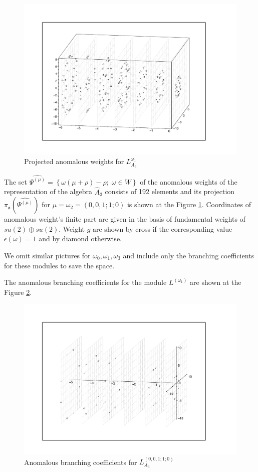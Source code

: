 \documentclass[a4paper,12pt]{article}
\theoremstyle{definition} \newtheorem{Def}{Definition}
\begin{document}
\begin{figure}[h!tb]
  \includegraphics[width=150mm]{A1+A1-A3_anom.pdf}
  \caption{Projected anomalous weights for $L^{\omega_1}_{A_3}$}
  \label{fig:A1+A1-A3_anom}
\end{figure}

The set  $\widehat{\Psi^{(\mu)}}=\left\{\omega(\mu+\rho)-\rho;\; \omega\in W\right\}$ of the anomalous weights of the representation of the algebra $\hat{A}_3$ consists of 192 elements and its projection $\pi_{\mathfrak{a}}\left(\widehat{\Psi^{(\mu)}}\right)$ for $\mu=\omega_2=(0,0,1;1;0)$ is shown at the Figure \ref{fig:A1+A1-A3_anom}. Coordinates of anomalous weight's finite part are given in the basis of fundamental weights of $su(2)\oplus su(2)$. Weight $g$ are shown by cross if the corresponding value $\epsilon(\omega)=1$ and by diamond otherwise.

We omit similar pictures for $\omega_0, \omega_1,\omega_3$ and include only the branching coefficients for these modules to save the space.

The anomalous branching coefficients for the module $L^{(\omega_1)}$ are shown at the Figure  \ref{fig:A1+A1-A3_branching}.
\begin{figure}[h!tb]
  \includegraphics[width=180mm]{A1+A1-A3_branching.pdf}
  \caption{Anomalous branching coefficients for $L^{(0,0,1;1;0)}_{A_3}$}
  \label{fig:A1+A1-A3_branching}
\end{figure}
\end{document}
